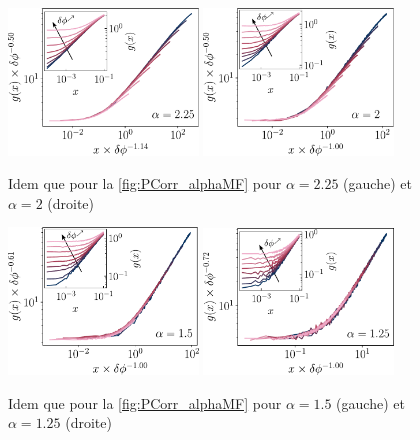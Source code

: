 \begin{figure}[h]
\centering
\includegraphics[width=0.45\textwidth]{Chapitre3/Figures/Interpretation/PCorrMF/PCorr_rescaled_MF_alpha225.pdf}
\includegraphics[width=0.45\textwidth]{Chapitre3/Figures/Interpretation/PCorrMF/PCorr_rescaled_MF_alpha2.pdf}
\caption{Idem que pour la \autoref{fig:PCorr_alphaMF} pour $\alpha = 2.25$ (gauche) et $\alpha = 2$ (droite)}
\label{fig:PCorrAnnexe2}
\end{figure}

\begin{figure}[h]
\centering
\includegraphics[width=0.45\textwidth]{Chapitre3/Figures/Interpretation/PCorrMF/PCorr_rescaled_MF_alpha15.pdf}
\includegraphics[width=0.45\textwidth]{Chapitre3/Figures/Interpretation/PCorrMF/PCorr_rescaled_MF_alpha125.pdf}
\caption{Idem que pour la \autoref{fig:PCorr_alphaMF} pour $\alpha = 1.5$ (gauche) et $\alpha = 1.25$ (droite)}
\label{fig:PCorrAnnexe3}
\end{figure}

